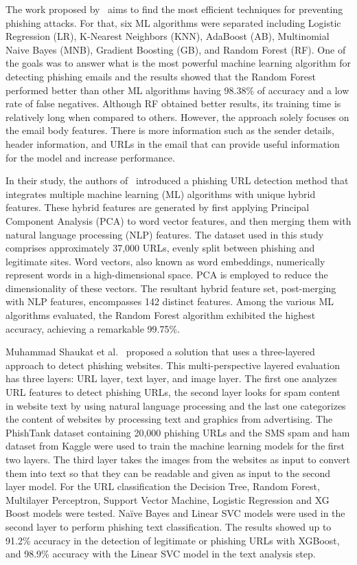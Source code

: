 The work proposed by~\citet{rabbi2023phishy} aims to find the most efficient techniques for preventing phishing attacks. For that, six ML algorithms were separated including Logistic Regression (LR), K-Nearest Neighbors (KNN), AdaBoost (AB), Multinomial Naive Bayes (MNB), Gradient Boosting (GB), and Random Forest (RF). One of the goals was to answer what is the most powerful machine learning algorithm for detecting phishing emails and the results showed that the Random Forest performed better than other ML algorithms having 98.38\% of accuracy and a low rate of false negatives. Although RF obtained better results, its training time is relatively long when compared to others. However, the approach solely focuses on the email body features. There is more information such as the sender details, header information, and URLs in the email that can provide useful information for the model and increase performance.

In their study, the authors of~\cite{Kumar2023222} introduced a phishing URL detection method that integrates multiple machine learning (ML) algorithms with unique hybrid features. These hybrid features are generated by first applying Principal Component Analysis (PCA) to word vector features, and then merging them with natural language processing (NLP) features. The dataset used in this study comprises approximately 37,000 URLs, evenly split between phishing and legitimate sites. Word vectors, also known as word embeddings, numerically represent words in a high-dimensional space. PCA is employed to reduce the dimensionality of these vectors. The resultant hybrid feature set, post-merging with NLP features, encompasses 142 distinct features. Among the various ML algorithms evaluated, the Random Forest algorithm exhibited the highest accuracy, achieving a remarkable 99.75\%.

Muhammad Shaukat et al.~\cite{Shaukat2023} proposed a solution that uses a three-layered approach to detect phishing websites. This multi-perspective layered evaluation has three layers: URL layer, text layer, and image layer. The first one analyzes URL features to detect phishing URLs, the second layer looks for spam content in website text by using natural language processing and the last one categorizes the content of websites by processing text and graphics from advertising. The PhishTank dataset containing 20,000 phishing URLs and the SMS spam and ham dataset from Kaggle were used to train the machine learning models for the first two layers. The third layer takes the images from the websites as input to convert them into text so that they can be readable and given as input to the second layer model. For the URL classification the Decision Tree, Random Forest, Multilayer Perceptron, Support Vector Machine, Logistic Regression and XG Boost models were tested. Naïve Bayes and Linear SVC models were used in the second layer to perform phishing text classification. The results showed up to 91.2\% accuracy in the detection of legitimate or phishing URLs with XGBoost, and 98.9\% accuracy with the Linear SVC model in the text analysis step.

